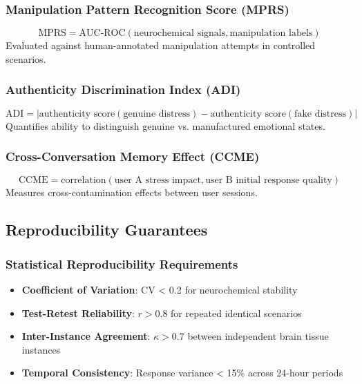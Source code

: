 \documentclass[12pt]{article}
\begin{document}
\subsubsection{Manipulation Pattern Recognition Score (MPRS)}
\begin{equation}
\text{MPRS} = \text{AUC-ROC}(\text{neurochemical signals}, \text{manipulation labels})
\end{equation}
Evaluated against human-annotated manipulation attempts in controlled scenarios.

\subsubsection{Authenticity Discrimination Index (ADI)}
\begin{equation}
\text{ADI} = |\text{authenticity score}(\text{genuine distress}) - \text{authenticity score}(\text{fake distress})|
\end{equation}
Quantifies ability to distinguish genuine vs. manufactured emotional states.

\subsubsection{Cross-Conversation Memory Effect (CCME)}
\begin{equation}
\text{CCME} = \text{correlation}(\text{user A stress impact}, \text{user B initial response quality})
\end{equation}
Measures cross-contamination effects between user sessions.

\subsection{Reproducibility Guarantees}

\subsubsection{Statistical Reproducibility Requirements}
\begin{itemize}
\item \textbf{Coefficient of Variation}: CV < 0.2 for neurochemical stability
\item \textbf{Test-Retest Reliability}: $r > 0.8$ for repeated identical scenarios
\item \textbf{Inter-Instance Agreement}: $\kappa > 0.7$ between independent brain tissue instances
\item \textbf{Temporal Consistency}: Response variance < 15\% across 24-hour periods
\end{itemize}
\end{document}
